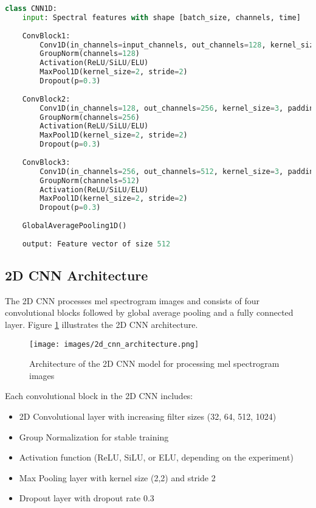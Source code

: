 \begin{lstlisting}[language=Python, style=pseudocode, caption=1D CNN Architecture (Pseudocode)]
class CNN1D:
    input: Spectral features with shape [batch_size, channels, time]
    
    ConvBlock1:
        Conv1D(in_channels=input_channels, out_channels=128, kernel_size=3, padding=1)
        GroupNorm(channels=128)
        Activation(ReLU/SiLU/ELU)
        MaxPool1D(kernel_size=2, stride=2)
        Dropout(p=0.3)
    
    ConvBlock2:
        Conv1D(in_channels=128, out_channels=256, kernel_size=3, padding=1)
        GroupNorm(channels=256)
        Activation(ReLU/SiLU/ELU)
        MaxPool1D(kernel_size=2, stride=2)
        Dropout(p=0.3)
    
    ConvBlock3:
        Conv1D(in_channels=256, out_channels=512, kernel_size=3, padding=1)
        GroupNorm(channels=512)
        Activation(ReLU/SiLU/ELU)
        MaxPool1D(kernel_size=2, stride=2)
        Dropout(p=0.3)
    
    GlobalAveragePooling1D()
    
    output: Feature vector of size 512
\end{lstlisting}

\subsection{2D CNN Architecture}

The 2D CNN processes mel spectrogram images and consists of four convolutional blocks followed by global average pooling and a fully connected layer. Figure \ref{fig:2d_cnn} illustrates the 2D CNN architecture.

\begin{figure}[h]
    \centering
    \texttt{[image: images/2d\_cnn\_architecture.png]}
    \caption{Architecture of the 2D CNN model for processing mel spectrogram images}
    \label{fig:2d_cnn}
\end{figure}

Each convolutional block in the 2D CNN includes:
\begin{itemize}
    \item 2D Convolutional layer with increasing filter sizes (32, 64, 512, 1024)
    \item Group Normalization for stable training
    \item Activation function (ReLU, SiLU, or ELU, depending on the experiment)
    \item Max Pooling layer with kernel size (2,2) and stride 2
    \item Dropout layer with dropout rate 0.3
\end{itemize}

